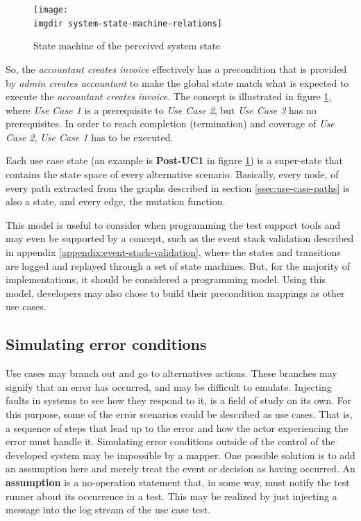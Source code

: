 \begin{figure}[!htbp]
\texttt{[image: \\imgdir system-state-machine-relations]}
\centering
\caption{State machine of the perceived system state}
\label{fig:system-state-machine-relations}
\end{figure}

\noindent 
So, the \emph{accountant creates invoice} effectively has a precondition that is provided by \emph{admin creates accountant} to make the global state match what is expected to execute the \emph{accountant creates invoice}. The concept is illustrated in figure \ref{fig:system-state-machine-relations}, where \emph{Use Case 1} is a prerequisite to \emph{Use Case 2}, but \emph{Use Case 3} has no prerequisites. In order to reach completion (termination) and coverage of \emph{Use Case 2}, \emph{Use Case 1} has to be executed.\smallskip

\noindent Each use case state (an example is \textbf{Post-UC1} in figure \ref{fig:system-state-machine-relations}) is a super-state that contains the state space of every alternative scenario. Basically, every node, of every path extracted from the graphs described in section \ref{ssec:use-case-paths} is also a state, and every edge, the mutation function.\medskip

\noindent This model is useful to consider when programming the test support tools and may even be supported by a concept, such as the event stack validation described in appendix \ref{appendix:event-stack-validation}, where the states and transitions are logged and replayed through a set of state machines. But, for the majority of implementations, it should be considered a programming model. Using this model, developers may also chose to build their precondition mappings as other use cases.

\subsection{Simulating error conditions}
\label{ssec:simulating-error-conditions}
Use cases may branch out and go to alternatives actions. These branches may signify that an error has occurred, and may be difficult to emulate. Injecting faults in systems to see how they respond to it, is a field of study on its own. For this purpose, some of the error scenarios could be described as use cases. That is, a sequence of steps that lead up to the error and how the actor experiencing the error must handle it. Simulating error conditions outside of the control of the developed system may be impossible by a mapper. One possible solution is to add an assumption here and merely treat the event or decision as having occurred. An \textbf{assumption} is a no-operation statement that, in some way, must notify the test runner about its occurrence in a test. This may be realized by just injecting a message into the log stream of the use case test.

